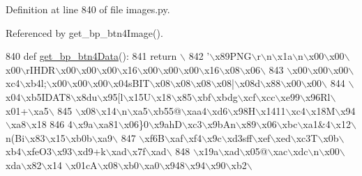 Definition at line 840 of file images.\+py.



Referenced by get\+\_\+bp\+\_\+btn4\+Image().


\begin{DoxyCode}
840 \textcolor{keyword}{def }\hyperlink{namespaceimages_aabed8c0b0b17b674f4da05e431d02b0e}{get\_bp\_btn4Data}():
841     \textcolor{keywordflow}{return} \(\backslash\)
842 \textcolor{stringliteral}{'\(\backslash\)x89PNG\(\backslash\)r\(\backslash\)n\(\backslash\)x1a\(\backslash\)n\(\backslash\)x00\(\backslash\)x00\(\backslash\)x00\(\backslash\)rIHDR\(\backslash\)x00\(\backslash\)x00\(\backslash\)x00\(\backslash\)x16\(\backslash\)x00\(\backslash\)x00\(\backslash\)x00\(\backslash\)x16\(\backslash\)x08\(\backslash\)x06\(\backslash\)}
843 \textcolor{stringliteral}{\(\backslash\)x00\(\backslash\)x00\(\backslash\)x00\(\backslash\)xc4\(\backslash\)xb4l;\(\backslash\)x00\(\backslash\)x00\(\backslash\)x00\(\backslash\)x04sBIT\(\backslash\)x08\(\backslash\)x08\(\backslash\)x08\(\backslash\)x08|\(\backslash\)x08d\(\backslash\)x88\(\backslash\)x00\(\backslash\)x00\(\backslash\)}
844 \textcolor{stringliteral}{\(\backslash\)x04\(\backslash\)xb5IDAT8\(\backslash\)x8du\(\backslash\)x95[l\(\backslash\)x15U\(\backslash\)x18\(\backslash\)x85\(\backslash\)xbf\(\backslash\)xbdg\(\backslash\)xcf\(\backslash\)xcc\(\backslash\)xe99\(\backslash\)x96Rl\(\backslash\)x01+\(\backslash\)xa5\(\backslash\)}
845 \textcolor{stringliteral}{\(\backslash\)x08\(\backslash\)x14\(\backslash\)n\(\backslash\)xa5\(\backslash\)xb55@\(\backslash\)xaa4\(\backslash\)xd6\(\backslash\)x98H\(\backslash\)x1411\(\backslash\)xc4\(\backslash\)x18M\(\backslash\)x94\(\backslash\)xa8\(\backslash\)x18%
846 \textcolor{stringliteral}{4\(\backslash\)x9a\(\backslash\)xa81\(\backslash\)x06\}0\(\backslash\)x9ahD\(\backslash\)xc3\(\backslash\)x9bAn\(\backslash\)x89\(\backslash\)x06\(\backslash\)xbc\(\backslash\)xa1&4\(\backslash\)x12\(\backslash\)n(Bi\(\backslash\)x83\(\backslash\)x15\(\backslash\)xb0b\(\backslash\)xa9\(\backslash\)}
847 \textcolor{stringliteral}{\(\backslash\)xf6B\(\backslash\)xaf\(\backslash\)xf4\(\backslash\)x9c\(\backslash\)xd3sff\(\backslash\)xef\(\backslash\)xed\(\backslash\)xc3T\(\backslash\)x0b\(\backslash\)xb4\(\backslash\)xfeO3\(\backslash\)x93\(\backslash\)xd9+k\(\backslash\)xad\(\backslash\)x7f\(\backslash\)xad\(\backslash\)}
848 \textcolor{stringliteral}{\(\backslash\)x19a\(\backslash\)xad\(\backslash\)x05@\(\backslash\)xac\(\backslash\)xdc\(\backslash\)n\(\backslash\)x00\(\backslash\)xda\(\backslash\)x82\(\backslash\)x14 \(\backslash\)x01cA\(\backslash\)x08\(\backslash\)xb0\(\backslash\)xa0\(\backslash\)x948\(\backslash\)x94\(\backslash\)x90\(\backslash\)xb2\(\backslash\)}
}
\end{DoxyCode}
